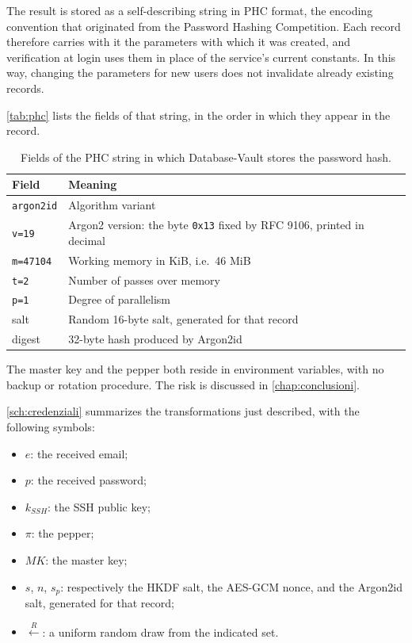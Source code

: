 The result is stored as a self-describing string in PHC format, the encoding convention
that originated from the Password Hashing Competition. Each record therefore carries with it the parameters with which it was created,
and verification at login uses them in place of the service's current constants.
In this way, changing the parameters for new users does not invalidate already existing records.

\autoref{tab:phc} lists the fields of that string, in the order in which they appear in the record.

\begin{table}[H]
\centering
\caption{Fields of the PHC string in which Database-Vault stores the password hash.}
\label{tab:phc}
\begin{tabular}{@{}l p{}@{}}
\hline
\textbf{Field} & \textbf{Meaning} \\
\hline
\texttt{argon2id} & Algorithm variant \\
\texttt{v=19} & Argon2 version: the byte \texttt{0x13} fixed by RFC 9106, printed in decimal \\
\texttt{m=47104} & Working memory in KiB, i.e.\ 46 MiB \\
\texttt{t=2} & Number of passes over memory \\
\texttt{p=1} & Degree of parallelism \\
salt & Random 16-byte salt, generated for that record \\
digest & 32-byte hash produced by Argon2id \\
\hline
\end{tabular}
\end{table}

The master key and the pepper both reside in environment variables, with no backup or
rotation procedure. The risk is discussed in \autoref{chap:conclusioni}.


\autoref{sch:credenziali} summarizes the transformations just described, with the following symbols:

\begin{itemize}
    \item $e$: the received email;
    \item $p$: the received password;
    \item $k_{SSH}$: the SSH public key;
    \item $\pi$: the pepper;
    \item $MK$: the master key;
    \item $s$, $n$, $s_p$: respectively the HKDF salt, the AES-GCM nonce, and the
    Argon2id salt, generated for that record;
    \item $\stackrel{R}{\leftarrow}$: a uniform random draw from the indicated set.
\end{itemize}

